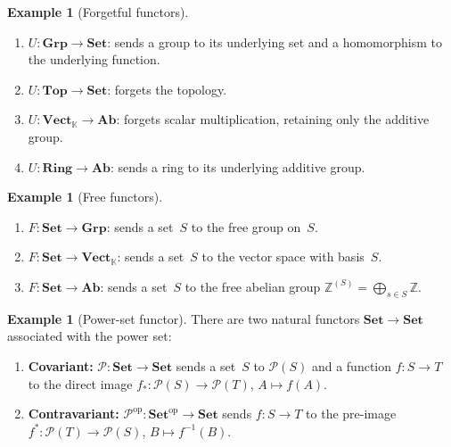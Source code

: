 \documentclass[a4paper,12pt]{book}
\newcommand{\Set}{\mathbf{Set}}
\newcommand{\Grp}{\mathbf{Grp}}
\newcommand{\Ab}{\mathbf{Ab}}
\newcommand{\Ring}{\mathbf{Ring}}
\newcommand{\Top}{\mathbf{Top}}
\newcommand{\Vect}{\mathbf{Vect}}
\newcommand{\op}{\mathrm{op}}
\newcommand{\Z}{\mathbb{Z}}
\newcommand{\K}{\mathbb{K}}
\theoremstyle{definition}
\newtheorem{example}[definition]{Example}
\theoremstyle{plain}
\theoremstyle{remark}
\begin{document}
\begin{example}[Forgetful functors]\label{ex:forgetful}
\begin{enumerate}[label=(\roman*)]
    \item $U\colon\Grp\to\Set$: sends a group to its underlying set
          and a homomorphism to the underlying function.
    \item $U\colon\Top\to\Set$: forgets the topology.
    \item $U\colon\Vect_\K\to\Ab$: forgets scalar multiplication,
          retaining only the additive group.
    \item $U\colon\Ring\to\Ab$: sends a ring to its underlying
          additive group.
\end{enumerate}
\end{example}

\begin{example}[Free functors]\label{ex:free-functor}
\begin{enumerate}[label=(\roman*)]
    \item $F\colon\Set\to\Grp$: sends a set~$S$ to the free group on~$S$.
    \item $F\colon\Set\to\Vect_\K$: sends a set~$S$ to the vector
          space with basis~$S$.
    \item $F\colon\Set\to\Ab$: sends a set~$S$ to the free abelian
          group $\Z^{(S)} = \bigoplus_{s\in S}\Z$.
\end{enumerate}
\end{example}

\begin{example}[Power-set functor]\label{ex:powerset-functor}
There are two natural functors $\Set\to\Set$ associated with the power
set:
\begin{enumerate}[label=(\roman*)]
    \item \textbf{Covariant:} $\mathcal{P}\colon\Set\to\Set$ sends a
          set~$S$ to $\mathcal{P}(S)$ and a function $f\colon S\to T$
          to the direct image $f_*\colon \mathcal{P}(S)\to\mathcal{P}(T)$,
          $A\mapsto f(A)$.
    \item \textbf{Contravariant:} $\mathcal{P}^{\op}\colon\Set^{\op}\to\Set$
          sends $f\colon S\to T$ to the pre-image
          $f^*\colon\mathcal{P}(T)\to\mathcal{P}(S)$,
          $B\mapsto f^{-1}(B)$.
\end{enumerate}
\end{example}
\end{document}

